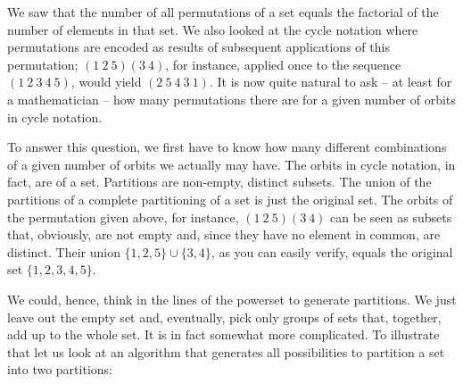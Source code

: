 \documentclass{scrreprt}
\begin{document}
We saw that the number of all permutations of a set 
equals the factorial of the number of elements in that set.
We also looked at the cycle notation where permutations
are encoded as results of subsequent
applications of this permutation; $(1~2~5)(3~4)$, for instance,
applied once to the sequence $(1~2~3~4~5)$, would yield $(2~5~4~3~1)$.
It is now quite natural to ask -- at least for a mathematician --
how many permutations there are for a given number of orbits
in cycle notation.

To answer this question,
we first have to know how many different combinations 
of a given number of orbits we actually may have.
The orbits in cycle notation, in fact, are 
of a set. Partitions are non-empty, distinct subsets.
The union of the partitions of a 
complete partitioning of a set is just the original set.
The orbits of the permutation given above, for instance,
$(1~2~5)(3~4)$ can be seen as subsets that,
obviously, are not empty and, 
since they have no element in common,
are distinct.
Their union $\lbrace 1,2,5\rbrace \cup \lbrace 3,4\rbrace$,
as you can easily verify, equals
the original set $\lbrace 1,2,3,4,5\rbrace$.

We could, hence, think in the lines of the powerset
to generate partitions. We just leave out the empty set
and, eventually, pick only groups of sets that, together,
add up to the whole set.
It is in fact somewhat more complicated.
To illustrate that let us look at an
algorithm that generates all possibilities to
partition a set into two partitions:
\end{document}
